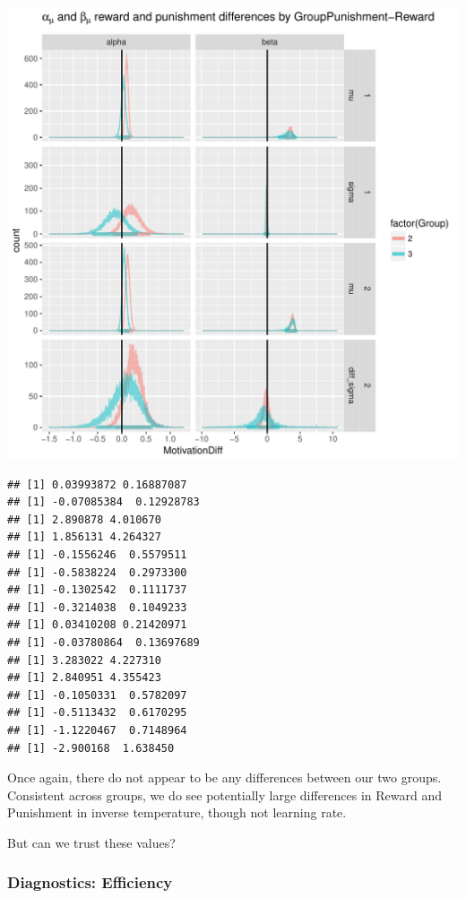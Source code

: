 \documentclass{article}\usepackage[]{graphicx}\usepackage[]{color}
\makeatletter
\def\maxwidth{ %
  \ifdim\Gin@nat@width>\linewidth
    \linewidth
  \else
    \Gin@nat@width
  \fi
}
\newenvironment{kframe}{%
 \def\at@end@of@kframe{}%
 \ifinner\ifhmode%
  \def\at@end@of@kframe{\end{minipage}}%
  \begin{minipage}{\columnwidth}%
 \fi\fi%
 \def\FrameCommand##1{\hskip\@totalleftmargin \hskip-\fboxsep
 \colorbox{shadecolor}{##1}\hskip-\fboxsep
     \hskip-\linewidth \hskip-\@totalleftmargin \hskip\columnwidth}%
 \MakeFramed {\advance\hsize-\width
   \@totalleftmargin\z@ \linewidth\hsize
   \@setminipage}}%
 {\par\unskip\endMakeFramed%
 \at@end@of@kframe}
\newenvironment{knitrout}{}{} %
\makeatother
\begin{document}
\begin{knitrout}
\includegraphics[width=\maxwidth]{figure/unnamed-chunk-9-2} 
\begin{kframe}\begin{verbatim}
## [1] 0.03993872 0.16887087
## [1] -0.07085384  0.12928783
## [1] 2.890878 4.010670
## [1] 1.856131 4.264327
## [1] -0.1556246  0.5579511
## [1] -0.5838224  0.2973300
## [1] -0.1302542  0.1111737
## [1] -0.3214038  0.1049233
## [1] 0.03410208 0.21420971
## [1] -0.03780864  0.13697689
## [1] 3.283022 4.227310
## [1] 2.840951 4.355423
## [1] -0.1050331  0.5782097
## [1] -0.5113432  0.6170295
## [1] -1.1220467  0.7148964
## [1] -2.900168  1.638450
\end{verbatim}
\end{kframe}
\end{knitrout}

Once again, there do not appear to be any differences between our two groups. Consistent across groups, we do see potentially large differences in Reward and Punishment in inverse temperature, though not learning rate.

But can we trust these values?

\subsubsection*{Diagnostics: Efficiency}
\end{document}
